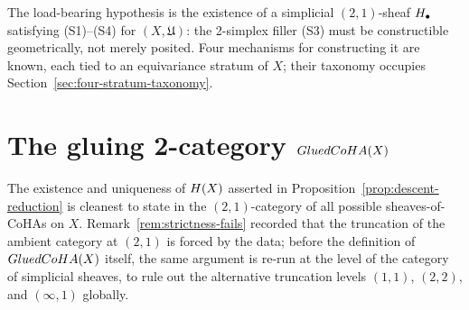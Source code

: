 The load-bearing hypothesis is the existence of a simplicial
$(2,1)$-sheaf $H_\bullet$ satisfying (S1)--(S4) for $(X,
\mathfrak{U})$: the 2-simplex filler (S3) must be constructible
geometrically, not merely posited. Four mechanisms for constructing
it are known, each tied to an equivariance stratum of $X$; their
taxonomy occupies Section~\ref{sec:four-stratum-taxonomy}.

\section{The gluing 2-category \texorpdfstring{$GluedCoHA(X)$}{GluedCoHA(X)}}
\label{sec:glue-2cat}

The existence and uniqueness of $H(X)$ asserted in
Proposition~\ref{prop:descent-reduction} is cleanest to state in
the $(2,1)$-category of all possible sheaves-of-CoHAs on $X$.
Remark~\ref{rem:strictness-fails} recorded that the truncation of
the ambient category at $(2,1)$ is forced by the data; before the
definition of $GluedCoHA(X)$ itself, the same argument is re-run at
the level of the category of simplicial sheaves, to rule out the
alternative truncation levels $(1,1)$, $(2,2)$, and $(\infty,1)$
globally.

